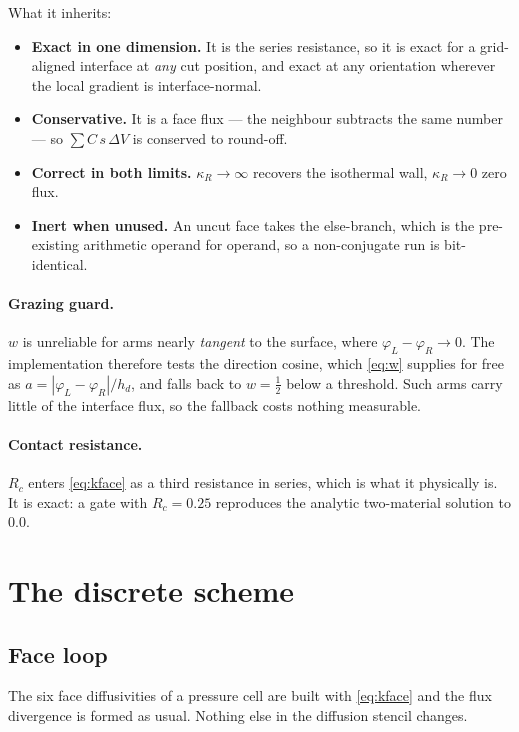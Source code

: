\documentclass[11pt,a4paper]{article}
\begin{document}
What it inherits:
\begin{itemize}
\item \textbf{Exact in one dimension.} It is the series resistance, so it is
      exact for a grid-aligned interface at \emph{any} cut position, and exact
      at any orientation wherever the local gradient is interface-normal.
\item \textbf{Conservative.} It is a face flux --- the neighbour subtracts the
      same number --- so $\sum C\,s\,\Delta V$ is conserved to round-off.
\item \textbf{Correct in both limits.} $\kappa_R\to\infty$ recovers the
      isothermal wall, $\kappa_R\to0$ zero flux.
\item \textbf{Inert when unused.} An uncut face takes the else-branch, which is
      the pre-existing arithmetic operand for operand, so a non-conjugate run
      is bit-identical.
\end{itemize}

\paragraph{Grazing guard.}
$w$ is unreliable for arms nearly \emph{tangent} to the surface, where
$\varphi_L-\varphi_R\to0$. The implementation therefore tests the direction
cosine, which \eqref{eq:w} supplies for free as
$a = |\varphi_L-\varphi_R|/h_d$, and falls back to $w=\tfrac12$ below a
threshold. Such arms carry little of the interface flux, so the fallback costs
nothing measurable.

\paragraph{Contact resistance.}
$R_c$ enters \eqref{eq:kface} as a third resistance in series, which is what it
physically is. It is exact: a gate with $R_c=0.25$ reproduces the analytic
two-material solution to \textbf{$0.0$}.

\section{The discrete scheme}

\subsection{Face loop}
The six face diffusivities of a pressure cell are built with \eqref{eq:kface}
and the flux divergence is formed as usual. Nothing else in the diffusion
stencil changes.
\end{document}
